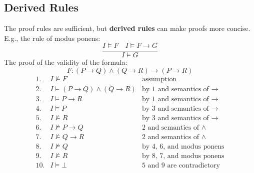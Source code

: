 \subsection{Derived Rules}
The proof rules are sufficient, but \textbf{derived rules} can make proofs more concise. E.g., the rule of modus ponens: \[
\frac{I\models F\quad I\models F\to G}{I\models G}
\]
The proof of the validity of the formula:\[
F:(P\to Q)\land (Q\to R)\to (P\to R)
\]
\[
\begin{array}{lll}
	1.& I\not\models F & \text{assumption} \\
	2.& I\models (P\to Q)\land (Q\to R) & \text{by 1 and semantics of $\to$} \\
	3.& I\models P\to R & \text{by 1 and semantics of $\to$} \\
	4.& I\models P & \text{by 3 and semantics of $\to$} \\
	5.& I\not\models R & \text{by 3 and semantics of $\to$} \\
	6.& I\not\models P\to Q & \text{2 and semantics of $\land$} \\
	7.& I\not\models Q\to R & \text{2 and semantics of $\land$} \\
	8.& I\not\models Q & \text{by 4, 6, and modus ponens} \\
	9.& I\not\models R & \text{by 8, 7, and modus ponens} \\
	10.& I\models\bot & \text{5 and 9 are contradictory}
\end{array}
\]


